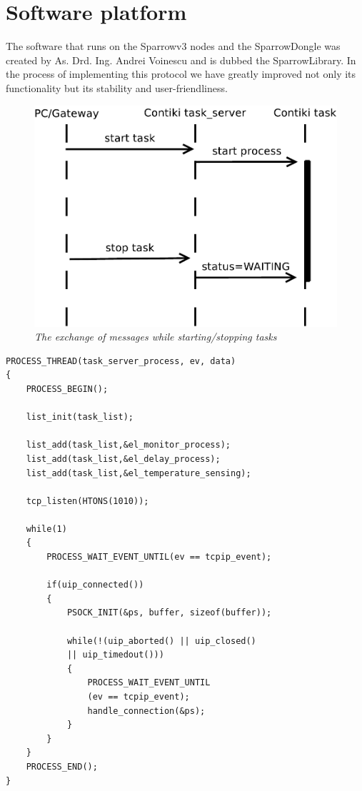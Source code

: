 
\chapter{Software platform}

The software that runs on the Sparrowv3 nodes and the SparrowDongle was created by As.
Drd. Ing. Andrei Voinescu and is dubbed the SparrowLibrary. In the process of
implementing this protocol we have greatly improved not only its functionality
but its stability and user-friendliness.

\begin{figure}[ht]
	\begin{center}
		\includegraphics[scale=0.5]{img/starttask.pdf}
	\end{center}
	\caption{\small \itshape{The exchange of messages while starting/stopping tasks}}
\end{figure}

\lstset{numbers=left, mathescape=true, nolol=false,caption=Task server snippet,label=lst:taskserver}
\begin{lstlisting}
PROCESS_THREAD(task_server_process, ev, data)
{
	PROCESS_BEGIN();

	list_init(task_list);

	list_add(task_list,&el_monitor_process);
	list_add(task_list,&el_delay_process);
	list_add(task_list,&el_temperature_sensing);

	tcp_listen(HTONS(1010));

	while(1) 
	{
		PROCESS_WAIT_EVENT_UNTIL(ev == tcpip_event);

		if(uip_connected()) 
		{
			PSOCK_INIT(&ps, buffer, sizeof(buffer));

			while(!(uip_aborted() || uip_closed() 
			|| uip_timedout())) 
			{
				PROCESS_WAIT_EVENT_UNTIL
				(ev == tcpip_event);
				handle_connection(&ps);
			}
		}
	}
	PROCESS_END();
}
\end{lstlisting}

